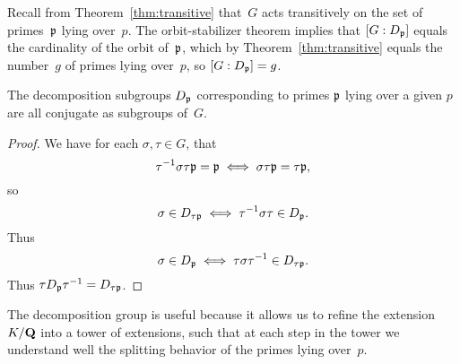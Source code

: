 Recall from Theorem~\ref{thm:transitive}
that~$G$ acts transitively on the set of primes~$\mathfrak{p}$ lying
over~$p$.  The orbit-stabilizer theorem implies that $[G:D_{\mathfrak{p}}]$ equals the cardinality of the 
orbit of~$\mathfrak{p}$, which by Theorem~\ref{thm:transitive}
equals the number~$g$ of primes lying over~$p$, so $[G:D_{\mathfrak{p}}]=g$.

\begin{lemma}
The decomposition subgroups $D_{\mathfrak{p}}$ corresponding to primes $\mathfrak{p}$
lying over a given $p$ are all conjugate as subgroups of~$G$.
\end{lemma}
\begin{proof}
We have for each $\sigma, \tau \in G$, that
$$\tau^{-1}\sigma \tau\mathfrak{p} = \mathfrak{p}
\iff
\sigma\tau \mathfrak{p} = \tau \mathfrak{p},
$$
so 
$$
\sigma \in D_{\tau\mathfrak{p}} \iff \tau^{-1}\sigma\tau\in D_{\mathfrak{p}}.
$$
Thus 
$$
 \sigma \in D_{\mathfrak{p}} \iff \tau \sigma \tau^{-1} \in D_{\tau \mathfrak{p}}.
$$
Thus $\tau D_{\mathfrak{p}}\tau^{-1} = D_{\tau \mathfrak{p}}$.
\end{proof}

The decomposition group is useful because it allows us
to refine the extension $K/\mathbf{Q}$ into a tower of extensions, such that at
each step in the tower we understand well the splitting behavior
of the primes lying over~$p$.  

